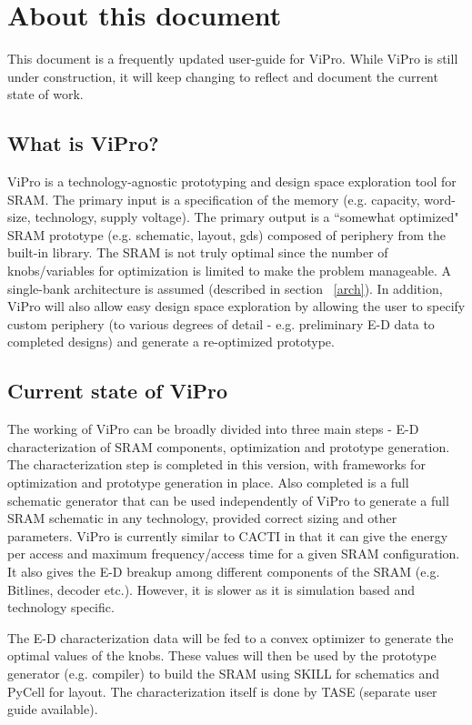 \section{About this document}
This document is a frequently updated user-guide for ViPro. While ViPro is still under construction, it will keep changing to reflect and document the current state of work.

\subsection{What is ViPro?}
ViPro is a technology-agnostic prototyping and design space exploration tool for SRAM. The primary input is a specification of the memory (e.g. capacity, word-size, technology, supply voltage). The primary output is a ``somewhat optimized" SRAM prototype (e.g. schematic, layout, gds) composed of periphery from the built-in library. The SRAM is not truly optimal since the number of knobs/variables for optimization is limited to make the problem manageable. A single-bank architecture is assumed (described in section ~\ref{arch}). In addition, ViPro will also allow easy design space exploration by allowing the user to specify custom periphery (to various degrees of detail - e.g. preliminary E-D data to completed designs) and generate a re-optimized prototype.

\subsection{Current state of ViPro}
The working of ViPro can be broadly divided into three main steps - E-D characterization of SRAM components, optimization and prototype generation. The characterization step is completed in this version, with frameworks for optimization and prototype generation in place. Also completed is a full schematic generator that can be used independently of ViPro to generate a full SRAM schematic in any technology, provided correct sizing and other parameters. ViPro is currently similar to CACTI in that it can give the energy per access and maximum frequency/access time for a given SRAM configuration. It also gives the E-D breakup among different components of the SRAM (e.g. Bitlines, decoder etc.). However, it is slower as it is simulation based and technology specific.

The E-D characterization data will be fed to a convex optimizer to generate the optimal values of the knobs. These values will then be used by the prototype generator (e.g. compiler) to build the SRAM using SKILL for schematics and PyCell for layout. The characterization itself is done by TASE (separate user guide available).

